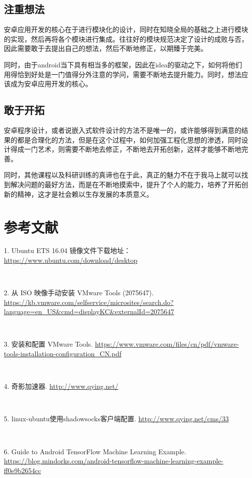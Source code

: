\documentclass[UTF8, Microsoft YaHei]{book}
\begin{document}
    \section{注重想法}
    安卓应用开发的核心在于进行模块化的设计，同时在知晓全局的基础之上进行模块的实现，然后再将各个模块进行集成。往往好的模块规范决定了设计的成败与否，因此需要敢于去提出自己的想法，然后不断地修正，以期臻于完美。

    同时，由于android当下具有相当多的框架，因此在idea的驱动之下，如何将他们用得恰到好处是一门值得分外注意的学问，需要不断地去提升能力。同时，想法应该成为安卓应用开发的核心。

    \section{敢于开拓}
    安卓程序设计，或者说嵌入式软件设计的方法不是唯一的，或许能够得到满意的结果的都是合理化的方法，但是在这个过程中，如何加强工程化思想的渗透，同时设计得成一门艺术，则需要不断地去修正，不断地去开拓创新，这样才能够不断地完善。

    同时，其他课程以及科研训练的真谛也在于此，真正的魅力不在于我马上就可以找到解决问题的最好方法，而是在不断地摸索中，提升了个人的能力，培养了开拓创新的精神，这才是社会赖以生存发展的本质意义。

    \chapter{参考文献}
    1. Ubuntu ETS 16.04 镜像文件下载地址： \url{https://www.ubuntu.com/download/desktop}

    ~

    2. 从 ISO 映像手动安装 VMware Tools (2075647). \url{https://kb.vmware.com/selfservice/microsites/search.do?language=en_US&cmd=displayKC&externalId=2075647}

    ~

    3. 安装和配置 VMware Tools.    \url{https://www.vmware.com/files/cn/pdf/vmware-tools-installation-configuration_CN.pdf}

    ~

    4. 奇影加速器.     \url{http://www.qying.net/}

    ~

    5. linux-ubuntu使用shadowsocks客户端配置.  \url{http://www.qying.net/cms/33}

    ~

    6. Guide to Android TensorFlow Machine Learning Example.  \url{https://blog.mindorks.com/android-tensorflow-machine-learning-example-ff0e9b2654cc}
\end{document}
